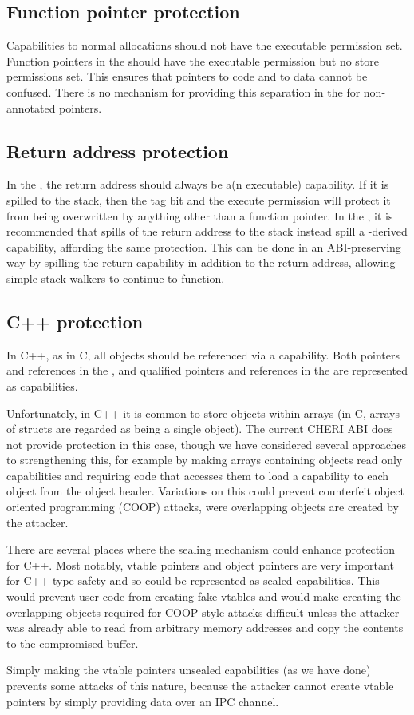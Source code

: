 \subsection{Function pointer protection}

Capabilities to normal allocations should not have the executable permission set.
Function pointers in the \purecapABI{} should have the executable permission but no store permissions set.
This ensures that pointers to code and to data cannot be confused.
There is no mechanism for providing this separation in the \hybridABI{} for non-annotated pointers.

\subsection{Return address protection}

In the \purecapABI{}, the return address should always be a(n executable) capability.
If it is spilled to the stack, then the tag bit and the execute permission will protect it from being overwritten by anything other than a function pointer.
In the \hybridABI{}, it is recommended that spills of the return address to the stack instead spill a -derived capability, affording the same protection.
This can be done in an ABI-preserving way by spilling the return capability in addition to the return address, allowing simple stack walkers to continue to function.

\subsection{C++ protection}

In C++, as in C, all objects should be referenced via a capability.
Both pointers and references in the \purecapABI{}, and qualified pointers and references in the \hybridABI{} are represented as capabilities.

Unfortunately, in C++ it is common to store objects within arrays (in C, arrays of structs are regarded as being a single object).
The current CHERI ABI does not provide protection in this case, though we have considered several approaches to strengthening this, for example by making arrays containing objects read only capabilities and requiring code that accesses them to load a capability to each object from the object header.
Variations on this could prevent counterfeit object oriented programming (COOP) attacks, were overlapping objects are created by the attacker.

There are several places where the sealing mechanism could enhance protection for C++.
Most notably, vtable pointers and  object pointers are very important for C++ type safety and so could be represented as sealed capabilities.
This would prevent user code from creating fake vtables and would make creating the overlapping objects required for COOP-style attacks difficult unless the attacker was already able to read from arbitrary memory addresses and copy the contents to the compromised buffer.

Simply making the vtable pointers unsealed capabilities (as we have done) prevents some attacks of this nature, because the attacker cannot create vtable pointers by simply providing data over an IPC channel.
